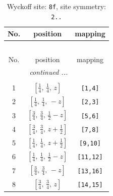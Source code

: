\documentclass[fleqn,8pt]{jsarticle}
\begin{document}
\begin{longtable}{ccc}
\caption{Wyckoff site: {\tt 8f}, site symmetry: {\tt 2..}}
 \\
 \hline \hline
No. & position & mapping \\ \hline \endfirsthead

\multicolumn{2}{l}{\tablename\ \thetable{}} \\
 \hline \hline
No. & position & mapping \\ \hline \endhead

 \hline \hline
\multicolumn{2}{r}{\footnotesize\it continued ...} \\ \endfoot

 \hline \hline
\multicolumn{2}{r}{} \\ \endlastfoot

1 & $\left[ \frac{1}{4},\, \frac{1}{4},\, z \right]$ & {\tt [1,4]} \\ \hline
2 & $\left[ \frac{1}{4},\, \frac{1}{4},\, - z \right]$ & {\tt [2,3]} \\ \hline
3 & $\left[ \frac{3}{4},\, \frac{3}{4},\, \frac{1}{2} - z \right]$ & {\tt [5,6]} \\ \hline
4 & $\left[ \frac{3}{4},\, \frac{3}{4},\, z + \frac{1}{2} \right]$ & {\tt [7,8]} \\ \hline
5 & $\left[ \frac{1}{4},\, \frac{1}{4},\, z + \frac{1}{2} \right]$ & {\tt [9,10]} \\ \hline
6 & $\left[ \frac{1}{4},\, \frac{1}{4},\, \frac{1}{2} - z \right]$ & {\tt [11,12]} \\ \hline
7 & $\left[ \frac{3}{4},\, \frac{3}{4},\, - z \right]$ & {\tt [13,16]} \\ \hline
8 & $\left[ \frac{3}{4},\, \frac{3}{4},\, z \right]$ & {\tt [14,15]} \\
\end{longtable}
\renewcommand{\arraystretch}{1.2}
\end{document}
